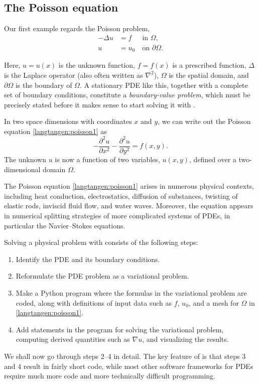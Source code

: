 \subsection{The Poisson equation}
\label{langtangen:poisson1:bvp}

Our first example regards the Poisson problem,
\begin{equation} \label{langtangen:poisson1}
  \begin{split}
    - \Delta u &= f \,\,\, \quad \mbox{in } \Omega,
    \\
    u &= u_0 \quad \mbox{on } \partial \Omega.
  \end{split}
\end{equation}

Here, $u = u(x)$ is the unknown function, $f =
f(x)$ is a prescribed function, $\Delta$ is the Laplace
operator (also often written as $\nabla^2$), $\Omega$ is the spatial
domain, and $\partial\Omega$ is the boundary of $\Omega$. A stationary
PDE like this, together with a complete set of boundary conditions,
constitute a \emph{boundary-value problem}, which must be precisely
stated before it makes sense to start solving it with \fenics.

In two space dimensions with coordinates $x$ and $y$, we can write out
the Poisson equation \eqref{langtangen:poisson1} as
\begin{equation}
- \frac{\partial^2 u}{\partial x^2}
- \frac{\partial^2 u}{\partial y^2} = f(x,y).
\end{equation}
The unknown $u$ is now a function of two variables, $u(x,y)$, defined
over a two-dimensional domain $\Omega$.

The Poisson equation \eqref{langtangen:poisson1} arises in numerous
physical contexts, including heat conduction, electrostatics, diffusion
of substances, twisting of elastic rods, inviscid fluid flow, and water
waves. Moreover, the equation appears in numerical splitting strategies
of more complicated systems of PDEs, in particular the Navier--Stokes
equations.

Solving a physical problem with \fenics{} consists of the following steps:
\begin{enumerate}
  \item Identify the PDE and its boundary conditions.

  \item Reformulate the PDE problem as a variational problem.

  \item Make a Python program where the formulas in the variational
  problem are coded, along with definitions of input data such as $f$,
  $u_0$, and a mesh for $\Omega$ in \eqref{langtangen:poisson1}.

  \item Add statements in the program for solving the variational problem,
  computing derived quantities such as $\nabla u$, and visualizing
  the results.
\end{enumerate}
We shall now go through steps 2--4 in detail.  The key feature of
\fenics{} is that steps 3 and 4 result in fairly short code, while
most other software frameworks for PDEs require much more code and more
technically difficult programming.

